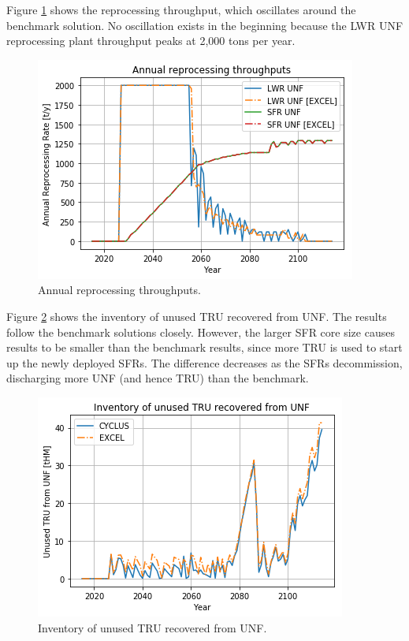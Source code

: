 Figure \ref{fig:rep} shows the reprocessing throughput, which oscillates around
the benchmark solution. No oscillation exists in the beginning because the
\gls{LWR} \gls{UNF} reprocessing plant throughput peaks at 2,000 tons per year.

\begin{figure}[htbp!]
    \begin{center}
        \includegraphics[scale=0.5]{./images/results_18/rep.png}
    \end{center}
        \caption{Annual reprocessing throughputs.}
    \label{fig:rep}
\end{figure}


Figure \ref{fig:tru} shows the inventory of unused \gls{TRU} recovered from \gls{UNF}.
The \Cyclus results follow the benchmark solutions closely. However,
the larger \gls{SFR} core size causes \Cyclus results to be smaller than the benchmark results,
since more \gls{TRU} is used to
start up the newly deployed \glspl{SFR}. The difference decreases as the
\glspl{SFR} decommission, discharging more \gls{UNF} (and hence \gls{TRU}) than
the benchmark.

\begin{figure}[htbp!]
	\begin{center}
		\includegraphics[scale=0.5]{./images/results_18/tru.png}
	\end{center}
        \caption{Inventory of unused \gls{TRU} recovered from \gls{UNF}.}
	\label{fig:tru}
\end{figure}

